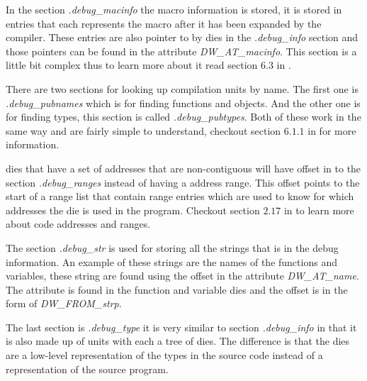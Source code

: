 In the section \emph{.debug\_macinfo} the macro information is stored, it is stored in entries that each represents the macro after it has been expanded by the compiler.
These entries are also pointer to by \glspl{die} in the \emph{.debug\_info} section and those pointers can be found in the attribute \emph{DW\_AT\_macinfo}.
This section is a little bit complex thus to learn more about it read section $6.3$ in \cite{dwarf}.


There are two sections for looking up compilation units by name.
The first one is \emph{.debug\_pubnames} which is for finding functions and objects.
And the other one is for finding types, this section is called \emph{.debug\_pubtypes}.
Both of these work in the same way and are fairly simple to understand, checkout section $6.1.1$ in \cite{dwarf} for more information.


\Glspl{die} that have a set of addresses that are non-contiguous will have offset in to the section \emph{.debug\_ranges} instead of having a address range.
This offset points to the start of a range list that contain range entries which are used to know for which addresses the \gls{die} is used in the program.
Checkout section $2.17$ in \cite{dwarf} to learn more about code addresses and ranges.


The section \emph{.debug\_str} is used for storing all the strings that is in the debug information.
An example of these strings are the names of the functions and variables, these string are found using the offset in the attribute \emph{DW\_AT\_name}.
The attribute is found in the function and variable dies and the offset is in the form of \emph{DW\_FROM\_strp}.


The last section is \emph{.debug\_type} it is very similar to section \emph{.debug\_info} in that it is also made up of units with each a \gls{tree} of \glspl{die}.
The difference is that the \glspl{die} are a low-level representation of the types in the source code instead of a representation of the source program.

